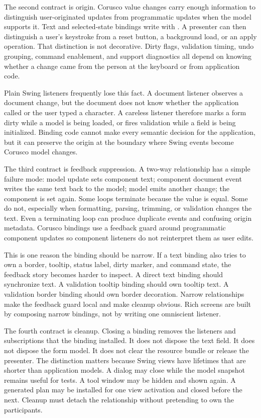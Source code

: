 The second contract is origin. Corusco value changes carry enough information
to distinguish user-originated updates from programmatic updates when the model
supports it. Text and selected-state bindings write with
. A presenter can then distinguish a user's keystroke
from a reset button, a background load, or an apply operation. That distinction
is not decorative. Dirty flags, validation timing, undo grouping, command
enablement, and support diagnostics all depend on knowing whether a change came
from the person at the keyboard or from application code.

Plain Swing listeners frequently lose this fact. A document listener observes a
document change, but the document does not know whether the application called
 or the user typed a character. A careless listener therefore
marks a form dirty while a model is being loaded, or fires validation while a
field is being initialized. Binding code cannot make every semantic decision
for the application, but it can preserve the origin at the boundary where Swing
events become Corusco model changes.

The third contract is feedback suppression. A two-way relationship has a simple
failure mode: model update sets component text; component document event writes
the same text back to the model; model emits another change; the component is
set again. Some loops terminate because the value is equal. Some do not,
especially when formatting, parsing, trimming, or validation changes the text.
Even a terminating loop can produce duplicate events and confusing origin
metadata. Corusco bindings use a feedback guard around programmatic component
updates so component listeners do not reinterpret them as user edits.

This is one reason the binding should be narrow. If a text binding also tries
to own a border, tooltip, status label, dirty marker, and command state, the
feedback story becomes harder to inspect. A direct text binding should
synchronize text. A validation tooltip binding should own tooltip text. A
validation border binding should own border decoration. Narrow relationships
make the feedback guard local and make cleanup obvious. Rich screens are built
by composing narrow bindings, not by writing one omniscient listener.

The fourth contract is cleanup. Closing a binding removes the listeners and
subscriptions that the binding installed. It does not dispose the text field.
It does not dispose the form model. It does not clear the resource bundle or
release the presenter. The distinction matters because Swing views have
lifetimes that are shorter than application models. A dialog may close while
the model snapshot remains useful for tests. A tool window may be hidden and
shown again. A generated plan may be installed for one view activation and
closed before the next. Cleanup must detach the relationship without pretending
to own the participants.

